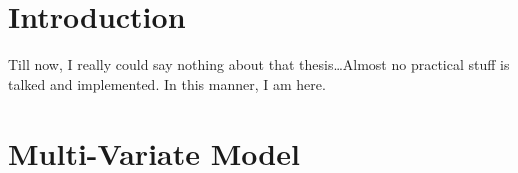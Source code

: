 \documentclass{article}
\begin{document}

\section{Introduction}
\label{sec:introduction}

Till now, I really could say nothing about that thesis\ldots Almost no
practical stuff is talked and implemented. In this manner, I am here.

\section{Multi-Variate Model}
\label{sec:multi-variate-model}
\end{document}
